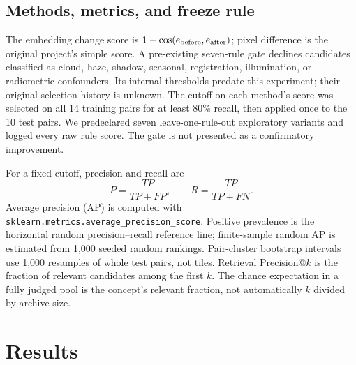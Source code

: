 \documentclass[conference,a4paper]{IEEEtran}
\begin{document}
\subsection{Methods, metrics, and freeze rule}
The embedding change score is $1-\cos(e_{\rm before},e_{\rm after})$; pixel difference is the original project's simple score. A pre-existing seven-rule gate declines candidates classified as cloud, haze, shadow, seasonal, registration, illumination, or radiometric confounders. Its internal thresholds predate this experiment; their original selection history is unknown. The cutoff on each method's score was selected on all 14 training pairs for at least 80\% recall, then applied once to the 10 test pairs. We predeclared seven leave-one-rule-out exploratory variants and logged every raw rule score. The gate is not presented as a confirmatory improvement.

For a fixed cutoff, precision and recall are
\begin{equation} P=\frac{TP}{TP+FP},\qquad R=\frac{TP}{TP+FN}. \end{equation}
Average precision (AP) is computed with \texttt{sklearn.metrics.average\_precision\_score}. Positive prevalence is the horizontal random precision--recall reference line; finite-sample random AP is estimated from 1,000 seeded random rankings. Pair-cluster bootstrap intervals use 1,000 resamples of whole test pairs, not tiles. Retrieval Precision@$k$ is the fraction of relevant candidates among the first $k$. The chance expectation in a fully judged pool is the concept's relevant fraction, not automatically $k$ divided by archive size.

\section{Results}
\end{document}
